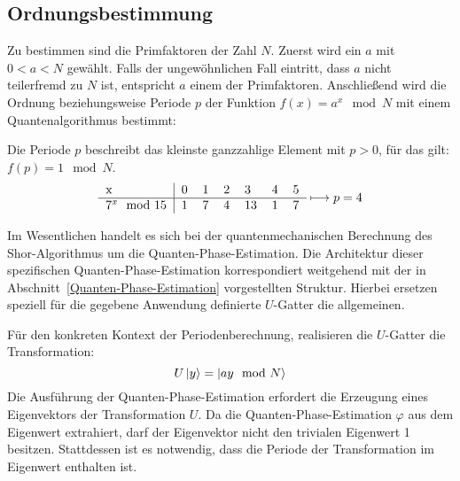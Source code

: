 \subsection{Ordnungsbestimmung}
Zu bestimmen sind die Primfaktoren der Zahl \(N\).
Zuerst wird ein \(a\) mit \(0 < a < N\) gewählt.
Falls der ungewöhnlichen Fall eintritt, dass \(a\) nicht teilerfremd zu \(N\) ist, entspricht \(a\) einem der Primfaktoren.
Anschließend wird die Ordnung beziehungsweise Periode \(p\) der Funktion \({f(x) = a^x \mod N}\) mit einem Quantenalgorithmus bestimmt:

Die Periode \(p\) beschreibt das kleinste ganzzahlige Element mit \({p > 0}\), für das gilt: \({f(p) = 1 \mod N}\).
\[
\begin{tabular}{l|llllll}
    x     &     0     &     1       &     2      &      3   &  4 &  5  \\ \hline
    \(7^x \mod 15\)    &      1     &        7     &       4     &     13     &  1 &  7 
\end{tabular} \longmapsto p = 4
\]

Im Wesentlichen handelt es sich bei der quantenmechanischen Berechnung des Shor-Algorithmus um die Quanten-Phase-Estimation.
Die Architektur dieser spezifischen Quanten-Phase-Estimation korrespondiert weitgehend mit der in Abschnitt~\ref{Quanten-Phase-Estimation} vorgestellten Struktur.
Hierbei ersetzen speziell für die gegebene Anwendung definierte \(U\)-Gatter die allgemeinen.

Für den konkreten Kontext der Periodenberechnung, realisieren die \(U\)-Gatter die Transformation:
\[U\ket{y} = \ket{ay \mod N}\] 
Die Ausführung der Quanten-Phase-Estimation erfordert die Erzeugung eines Eigenvektors der Transformation \(U\).
Da die Quanten-Phase-Estimation \(\varphi\) aus dem Eigenwert extrahiert, 
darf der Eigenvektor nicht den trivialen Eigenwert 1 besitzen.
Stattdessen ist es notwendig, dass die Periode der Transformation im Eigenwert enthalten ist.

